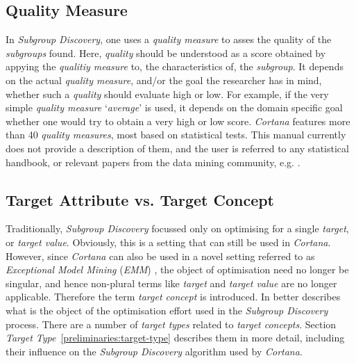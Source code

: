 \documentclass{article}
\begin{document}



\subsection{Quality Measure}
\label{preliminatier:quality-measure}
In \emph{Subgroup Discovery}, one uses a \emph{quality measure} to asses the quality of the \emph{subgroups} found.
Here, \emph{quality} should be understood as a score obtained by appying the \emph{qualitiy measure} to, the characteristics of, the \emph{subgroup}.
It depends on the actual \emph{quality measure}, and/or the goal the researcher has in mind, whether such a \emph{quality} should evaluate high or low.
For example, if the very simple \emph{quality measure} `\emph{average}' is used, it depends on the domain specific goal whether one would try to obtain a very high or low score.
\emph{Cortana} features more than 40 \emph{quality measures}, most based on statistical tests.
This manual currently does not provide a description of them, and the user is referred to any statistical handbook, or relevant papers from the data mining community, e.g. \cite{shb,remauv}.



\subsection{Target Attribute vs. Target Concept}
\label{preliminaries:target-concept}
Traditionally, \emph{Subgroup Discovery} focussed only on optimising for a single \emph{target}, or \emph{target value}.
Obviously, this is a setting that can still be used in \emph{Cortana}.
However, since \emph{Cortana} can also be used in a novel setting referred to as \emph{Exceptional Model Mining} (\emph{EMM}) \cite{emm,sdmbn}, the object of optimisation need no longer be singular, and hence non-plural terms like \emph{target} and \emph{target value} are no longer applicable.
Therefore the term \emph{target concept} is introduced.
In better describes what is the object of the optimisation effort used in the \emph{Subgroup Discovery} process.
There are a number of \emph{target types} related to \emph{target concepts}.
Section \emph{Target Type}~\ref{preliminaries:target-type} describes them in more detail, including their influence on the \emph{Subgroup Discovery} algorithm used by \emph{Cortana}.
\end{document}

